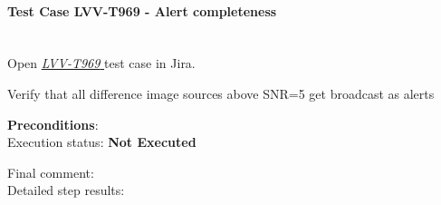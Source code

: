 \documentclass[DM,lsstdraft,STR,toc]{lsstdoc}
\begin{document}
    \paragraph{Test Case LVV-T969 - Alert completeness
 }\mbox{}\\

Open  \href{https://jira.lsstcorp.org/secure/Tests.jspa#/testCase/LVV-T969}{\textit{ LVV-T969 } }
test case in Jira.

    Verify that all difference image sources above SNR=5 get broadcast as
alerts


    \textbf{ Preconditions}:\\
    

    Execution status: {\bf Not Executed }

    Final comment:\\


    Detailed step results:
\end{document}
